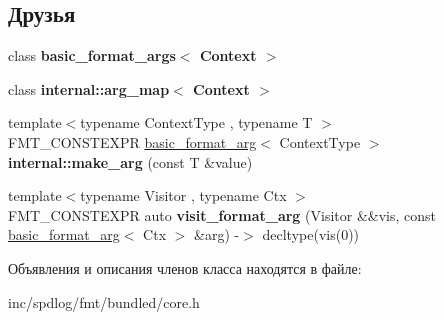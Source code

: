 \subsection*{Друзья}
\begin{DoxyCompactItemize}
\item 
\mbox{\label{classbasic__format__arg_ab8e9e33cc7b78829001a86ef6110ebb6}} 
class {\bfseries basic\+\_\+format\+\_\+args$<$ Context $>$}
\item 
\mbox{\label{classbasic__format__arg_a7974100f026be256213827458684be38}} 
class {\bfseries internal\+::arg\+\_\+map$<$ Context $>$}
\item 
\mbox{\label{classbasic__format__arg_ae7aafc9e488aab46969a5eae2da3d96b}} 
{\footnotesize template$<$typename Context\+Type , typename T $>$ }\\F\+M\+T\+\_\+\+C\+O\+N\+S\+T\+E\+X\+PR \hyperlink{classbasic__format__arg}{basic\+\_\+format\+\_\+arg}$<$ Context\+Type $>$ {\bfseries internal\+::make\+\_\+arg} (const T \&value)
\item 
\mbox{\label{classbasic__format__arg_aa922c52d8153f500a85f76b15d843657}} 
{\footnotesize template$<$typename Visitor , typename Ctx $>$ }\\F\+M\+T\+\_\+\+C\+O\+N\+S\+T\+E\+X\+PR auto {\bfseries visit\+\_\+format\+\_\+arg} (Visitor \&\&vis, const \hyperlink{classbasic__format__arg}{basic\+\_\+format\+\_\+arg}$<$ Ctx $>$ \&arg) -\/$>$ decltype(vis(0))
\end{DoxyCompactItemize}


Объявления и описания членов класса находятся в файле\+:\begin{DoxyCompactItemize}
\item 
inc/spdlog/fmt/bundled/core.\+h\end{DoxyCompactItemize}
